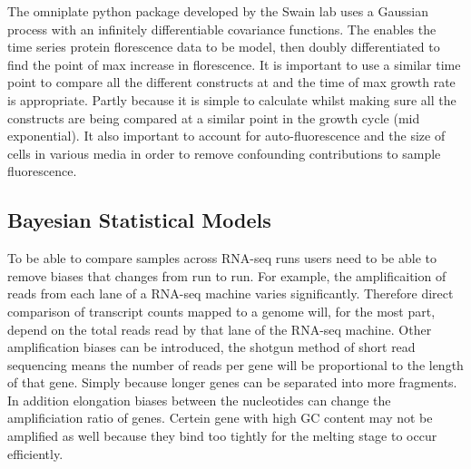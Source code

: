 \documentclass[../main.tex]{subfiles}
\begin{document}
The omniplate python package developed by the Swain lab uses a Gaussian process with an infinitely differentiable covariance functions. The enables the time series protein florescence data to be model, then doubly differentiated to find the point of max increase in florescence. It is important to use a similar time point to compare all the different constructs at and the time of max growth rate is appropriate. Partly because it is simple to calculate whilst making sure all the constructs are being compared at a similar point in the growth cycle (mid exponential). It also important to account for auto-fluorescence and the size of cells in various media in order to remove confounding contributions to sample fluorescence.

\subsection{Bayesian Statistical Models}

To be able to compare samples across RNA-seq runs users need to be able to remove biases that changes from run to run. For example, the amplificaition of reads from each lane of a RNA-seq machine varies significantly. Therefore direct comparison of transcript counts mapped to a genome will, for the most part, depend on the total reads read by that lane of the RNA-seq machine.  Other amplification biases can be introduced, the shotgun method of short read sequencing means the number of reads per gene will be proportional to the length of that gene. Simply because longer genes can be separated into more fragments. In addition elongation biases between the nucleotides can change the amplificiation ratio of genes. Certein gene with high GC content may not be amplified as well because they bind too tightly for the melting stage to occur efficiently. 
\end{document}
